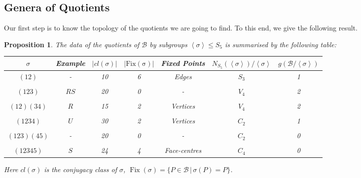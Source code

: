 \documentclass{amsart}
\newtheorem{prop}[theorem]{Proposition}
\newcommand{\pround}[1]{\left( #1 \right)}
\newcommand{\pangle}[1]{\left\langle #1 \right\rangle}
\begin{document}

\subsection{Genera of Quotients}\label{subsec: genera of quotients}
Our first step is to know the topology of the quotients we are going to find. To this end, we give the following result. 
\begin{prop}
The data of the quotients of $\mathcal{B}$ by subgroups $\pangle{\sigma} \leq S_5$ is summarised by the following table:
\begin{center}
\begin{tabular}{|c|c|c|c|c|c|c|}
    \hline 
$\sigma$ & Example & $\left\lvert{cl(\sigma)}\right\rvert$ & $\left\lvert{\operatorname{Fix(\sigma)}}\right\rvert$ & Fixed Points& $N_{S_5}(\pangle{\sigma})/\pangle{\sigma}$ & $g\pround{\mathcal{B}/\pangle{\sigma}}$ \\ 
\hline \hline 
    $(12)$ & - &10& 6 & Edges &$S_3$ &1\\ 
    &&&&&& \\
    $(123)$ & $R S$ &20 &0 &-&$V_4$ &2\\ 
    &&&&&& \\
    $(12)(34)$ & $R$ &15& 2 & Vertices&$V_4$&2\\
    &&&&&& \\
    $(1234)$ & $U$ &30& 2 &Vertices &$C_2$&1\\ 
    &&&&&& \\
    $(123)(45)$ & - &20& 0 &- &$C_2$&0\\  
    &&&&&&\\
    $(12345)$ & $S$ &24& 4 & Face-centres &$C_4$&0 \\ 
    \hline
\end{tabular}
\end{center}
Here $cl(\sigma)$ is the conjugacy class of $\sigma$, $\operatorname{Fix}(\sigma) = \{ P \in \mathcal{B} \, | \, \sigma(P) = P \}$. 
\end{prop}
\end{document}
